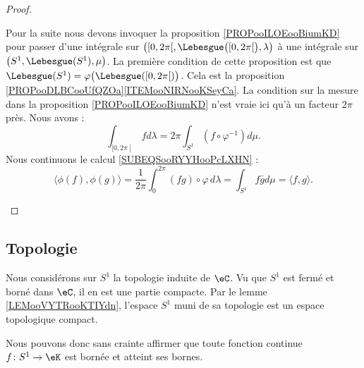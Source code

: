 \begin{proof}
\begin{subproof}
            Pour la suite nous devons invoquer la proposition \ref{PROPooILOEooBiumKD} pour passer d'une intégrale sur \( \big( \mathopen[ 0 , 2\pi \mathclose[,\Lebesgue\big( \mathopen[ 0 , 2\pi \mathclose[ \big),\lambda \big)\) à une intégrale sur \( \big( S^1,\Lebesgue(S^1), \mu \big)\). La première condition de cette proposition est que \( \Lebesgue(S^1)=\varphi\big( \Lebesgue(\mathopen[ 0 , 2\pi \mathclose[) \big)\). Cela est la proposition \ref{PROPooDLBCooUfQZOa}\ref{ITEMooNIRNooKSeyCa}. La condition sur la mesure dans la proposition \ref{PROPooILOEooBiumKD} n'est vraie ici qu'à un facteur \( 2\pi\) près. Nous avons :
                \begin{equation}
                    \int_{\mathopen[ 0 , 2\pi \mathclose[}fd\lambda=2\pi\int_{S^1}(f\circ \varphi^{-1})d\mu.
                \end{equation}
                Nous continuons le calcul \eqref{SUBEQSooRYYHooPcLXHN} :
                \begin{equation}
                    \langle \phi(f), \phi(g)\rangle =\frac{1}{ 2\pi }\int_0^{2\pi}(fg)\circ\varphi\, d\lambda=\int_{S^1}f\bar gd\mu=\langle f, g\rangle .
                \end{equation}
    \end{subproof}
\end{proof}

\subsection{Topologie}

Nous considérons sur \( S^1\) la topologie induite de \( \eC\). Vu que \( S^1\) est fermé et borné dans \( \eC\), il en est une partie compacte. Par le lemme \ref{LEMooVYTRooKTIYdn}, l'espace \( S^1\) muni de sa topologie est un espace topologique compact.

Nous pouvons donc sans crainte affirmer que toute fonction continue \( f\colon S^1\to \eK\) est bornée et atteint ses bornes.

